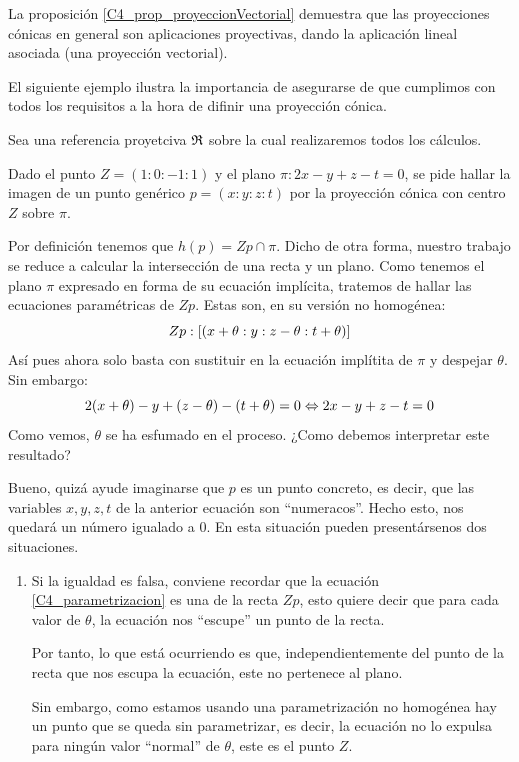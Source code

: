 La proposición \ref*{C4_prop_proyeccionVectorial} demuestra que las proyecciones cónicas en general son aplicaciones proyectivas, dando la aplicación lineal asociada (una proyección vectorial).

El siguiente ejemplo ilustra la importancia de asegurarse de que cumplimos con todos los requisitos a la hora de difinir una proyección cónica.
\begin{exa}
	Sea una referencia proyetciva $\mathfrak{R}$ sobre la cual realizaremos todos los cálculos.
	
	Dado el punto $Z=(1:0:-1:1)$ y el plano $\pi:2x-y+z-t=0$, se pide hallar la imagen de un punto genérico $p=(x:y:z:t)$ por la proyección cónica con centro $Z$ sobre $\pi$.
	
	Por definición tenemos que $h(p)=Zp\cap\pi$. Dicho de otra forma, nuestro trabajo se reduce a calcular la intersección de una recta y un plano. Como tenemos el plano $\pi$ expresado en forma de su ecuación implícita, tratemos de hallar las ecuaciones paramétricas de $Zp$. Estas son, en su versión no homogénea:
	\begin{equation}\label{C4_parametrizacion}Zp:\left [ (x+\theta:y:z-\theta:t+\theta) \right ]\end{equation}
	Así pues ahora solo basta con sustituir en la ecuación implítita de $\pi$ y despejar $\theta$. Sin embargo:
	\[2(x+\theta)-y+(z-\theta)-(t+\theta)=0\Leftrightarrow2x-y+z-t=0\]
	Como vemos, $\theta$ se ha esfumado en el proceso. ¿Como debemos interpretar este resultado?
	
	Bueno, quizá ayude imaginarse que $p$ es un punto concreto, es decir, que las variables $x,y,z,t$ de la anterior ecuación son ``numeracos''. Hecho esto, nos quedará un número igualado a $0$. En esta situación pueden presentársenos dos situaciones.
	\begin{enumerate}
		\item Si la igualdad es falsa, conviene recordar que la ecuación \eqref{C4_parametrizacion} es una  de la recta $Zp$, esto quiere decir que para cada valor de $\theta$, la ecuación nos ``escupe'' un punto de la recta.
		
		Por tanto, lo que está ocurriendo es que, independientemente del punto de la recta que nos escupa la ecuación, este no pertenece al plano.
		
		Sin embargo, como estamos usando una parametrización no homogénea hay un punto que se queda sin parametrizar, es decir, la ecuación no lo expulsa para ningún valor ``normal'' de $\theta$, este es el punto $Z$.
		

\end{enumerate}
\end{exa}
